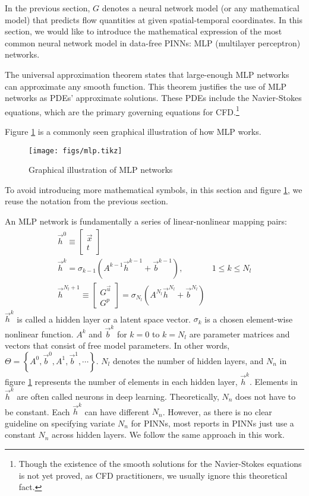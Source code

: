 
In the previous section, $G$ denotes a neural network model (or any mathematical model) that predicts flow quantities at given spatial-temporal coordinates.
In this section, we would like to introduce the mathematical expression of the most common neural network model in data-free PINNs: MLP (multilayer perceptron) networks.

The universal approximation theorem \cite{hornik_approximation_1991} states that large-enough MLP networks can approximate any smooth function.
This theorem justifies the use of MLP networks as PDEs' approximate solutions.
These PDEs include the Navier-Stokes equations, which are the primary governing equations for CFD.\footnote[0]{Though the existence of the smooth solutions for the Navier-Stokes equations is not yet proved, as CFD practitioners, we usually ignore this theoretical fact.}

Figure \ref{fig:mlp-graph} is a commonly seen graphical illustration of how MLP works.
\begin{figure}[hbt!]
    \singlespacing
    \texttt{[image: figs/mlp.tikz]}
    \caption{Graphical illustration of MLP networks}
    \label{fig:mlp-graph}
\end{figure}
To avoid introducing more mathematical symbols, in this section and figure \ref{fig:mlp-graph}, we reuse the notation from the previous section.

An MLP network is fundamentally a series of linear-nonlinear mapping pairs:
\begin{equation}\label{eq:mlp-formula}
    \begin{array}{ll}
        \vec{h}^0 \equiv \begin{bmatrix} \vec{x} \\ t \end{bmatrix} & \\
        \vec{h}^k = \sigma_{k-1}\left(A^{k-1}\vec{h}^{k-1}+\vec{b}^{k-1}\right)\text{,} & 1 \le k \le N_l \\
        \vec{h}^{N_l+1}\equiv \begin{bmatrix} G^{\vec{u}} \\ G^p \end{bmatrix} = \sigma_{N_l}\left(A^{N_l}\vec{h}^{N_l}+\vec{b}^{N_l}\right) &
    \end{array}
\end{equation}
$\vec{h}^k$ is called a hidden layer or a latent space vector.
$\sigma_{k}$ is a chosen element-wise nonlinear function.
$A^{k}$ and $\vec{b}^k$ for $k=0$ to $k=N_l$ are parameter matrices and vectors that consist of free model parameters.
In other words, $\Theta=\left\{A^0, \vec{b}^0, A^1, \vec{b}^1, \cdots \right\}$.
$N_l$ denotes the number of hidden layers, and $N_n$ in figure \ref{fig:mlp-graph} represents the number of elements in each hidden layer, $\vec{h}^k$.
Elements in $\vec{h}^k$ are often called neurons in deep learning.
Theoretically, $N_n$ does not have to be constant.
Each $\vec{h}^k$ can have different $N_n$.
However, as there is no clear guideline on specifying variate $N_n$ for PINNs, most reports in PINNs just use a constant $N_n$ across hidden layers.
We follow the same approach in this work.

